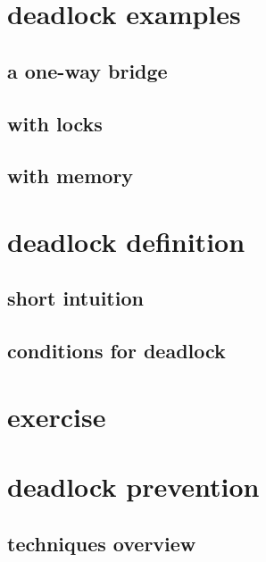 

\section{deadlock examples}

\subsection{a one-way bridge}


\subsection{with locks}


\subsection{with memory}

 
\section{deadlock definition}

\subsection{short intuition}



\subsection{conditions for deadlock}



\section{exercise}



\section{deadlock prevention}

\subsection{techniques overview}

